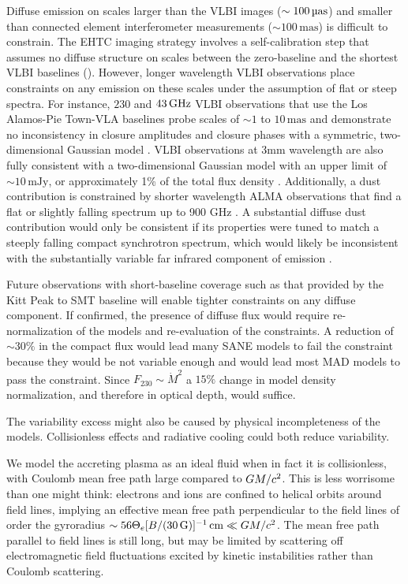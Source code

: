 Diffuse emission on scales larger than the VLBI images ($\sim 100\uas$) and smaller than connected element interferometer measurements ($\sim 100\,\mathrm{mas}$) is difficult to constrain.
The EHTC imaging strategy involves a self-calibration step that assumes no diffuse structure on scales between the zero-baseline and the shortest VLBI baselines ().
However, longer wavelength VLBI observations place constraints on any emission on these scales under the assumption of flat or steep spectra.
For instance, $230$ and $43\,\mathrm{GHz}$ VLBI observations that use the Los Alamos-Pie Town-VLA baselines probe scales of $\sim 1$ to $10\,\mathrm{mas}$ and demonstrate no inconsistency in closure amplitudes and closure phases with a symmetric, two-dimensional Gaussian model \citep{2004Sci...304..704B}.
VLBI observations at 3mm wavelength are also fully consistent with a two-dimensional Gaussian model with an upper limit of $\sim 10\,\mathrm{mJy}$, or approximately 1\% of the total flux density \citep{2019A&A...621A.119B}.
Additionally, a dust contribution is constrained by shorter wavelength ALMA observations that find a flat or slightly falling spectrum up to 900 GHz \citep{2019ApJ...881L...2B}.
A substantial diffuse dust contribution would only be consistent if its properties were tuned to match a steeply falling compact synchrotron spectrum, which would likely be inconsistent with the substantially variable far infrared component of \sgra emission \citep{2016ApJ...825...32S, 2018ApJ...862..129V}.

Future observations with short-baseline coverage such as that provided by the Kitt Peak to SMT baseline will enable tighter constraints on any diffuse component.
If confirmed, the presence of diffuse flux would require re-normalization of the models and re-evaluation of the constraints.
A reduction of $\sim 30\%$ in the compact flux would lead many SANE models to fail the  constraint because they would be not variable enough and would lead most MAD models to pass the  constraint.
Since $F_{230} \sim \dot{M}^2$ a $15\%$ change in model density normalization, and therefore in optical depth, would suffice.

The variability excess might also be caused by physical incompleteness of the models.
Collisionless effects and radiative cooling could both reduce variability.

We model the accreting plasma as an ideal fluid when in fact it is collisionless, with Coulomb mean free path large compared to $GM/c^2$.
This is less worrisome than one might think: electrons and ions are confined to helical orbits around field lines, implying an effective mean free path perpendicular to the field lines of order the gyroradius $\sim 56 \Theta_e [B/(30\,\mathrm{G})]^{-1} \,\mathrm{cm} \ll GM/c^2$.
The mean free path parallel to field lines is still long, but may be limited by scattering off electromagnetic field fluctuations excited by kinetic instabilities rather than Coulomb scattering.

